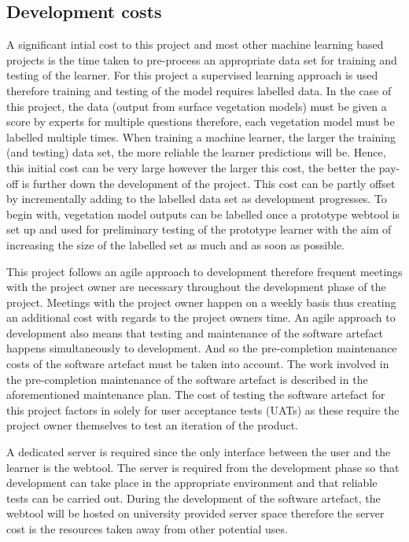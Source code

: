 \documentclass[11pt]{article} %
\numberwithin{equation}{section}
\begin{document}
\subsection{Development costs}
A significant intial cost to this project and most other machine learning based projects is the time taken to pre-process an appropriate data set for training and testing of the learner. For this project a supervised learning approach is used therefore training and testing of the model requires labelled data. In the case of this project, the data (output from surface vegetation models) must be given a score by experts for multiple questions therefore, each vegetation model must be labelled multiple times. When training a machine learner, the larger the training (and testing) data set, the more reliable the learner predictions will be. Hence, this initial cost can be very large however the larger this cost, the better the pay-off is further down the development of the project. This cost can be partly offset by incrementally adding to the labelled data set as development progresses. To begin with, vegetation model outputs can be labelled once a prototype webtool is set up and used for preliminary testing of the prototype learner with the aim of increasing the size of the labelled set as much and as soon as possible.\par

This project follows an agile approach to development therefore frequent meetings with the project owner are necessary throughout the development phase of the project. Meetings with the project owner happen on a weekly basis thus creating an additional cost with regards to the project owners time. An agile approach to development also means that testing and maintenance of the software artefact happens simultaneously to development. And so the pre-completion maintenance costs of the software artefact must be taken into account. The work involved in the pre-completion maintenance of the software artefact is described in the aforementioned maintenance plan. The cost of testing the software artefact for this project factors in solely for user acceptance tests (UATs) as these require the project owner themselves to test an iteration of the product.\par

A dedicated server is required since the only interface between the user and the learner is the webtool. The server is required from the development phase so that development can take place in the appropriate environment and that reliable tests can be carried out. During the development of the software artefact, the webtool will be hosted on university provided server space therefore the server cost is the resources taken away from other potential uses.\par
\end{document}
